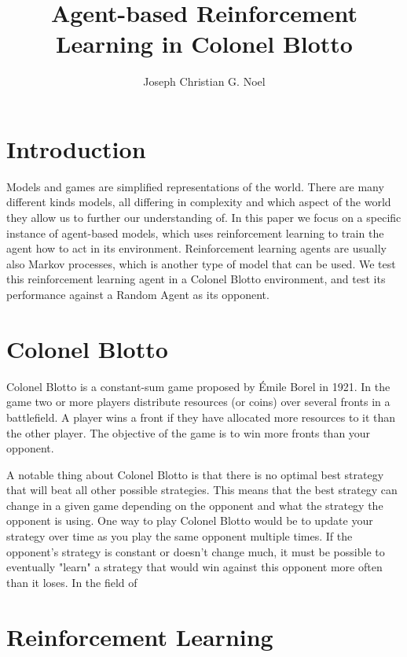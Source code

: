 \documentclass[11pt, oneside]{article}   	%
\title{Agent-based Reinforcement Learning in Colonel Blotto}
\author{Joseph Christian G. Noel}
\date{}							%
\begin{document}
\maketitle

\section{Introduction}

Models and games are simplified representations of the world. There are many different kinds models, all differing in complexity and which aspect of the world they allow us to further our understanding of. In this paper we focus on a specific instance of agent-based models, which uses reinforcement learning to train the agent how to act in its environment. Reinforcement learning agents are usually also Markov processes, which is another type of model that can be used. We test this reinforcement learning agent in a Colonel Blotto environment, and test its performance against a Random Agent as its opponent.

\section{Colonel Blotto}


Colonel Blotto is a constant-sum game proposed by Émile Borel in 1921\cite{Borel1953}. In the game two or more players distribute resources (or coins) over several fronts in a battlefield. A player wins a front if they have allocated more resources to it than the other player. The objective of the game is to win more fronts than your opponent.

\hfill

A notable thing about Colonel Blotto is that there is no optimal best strategy that will beat all other possible strategies. This means that the best strategy can change in a given game depending on the opponent and what the strategy the opponent is using. One way to play Colonel Blotto would be to update your strategy over time as you play the same opponent multiple times. If the opponent's strategy is constant or doesn't change much, it must be possible to eventually "learn" a strategy that would win against this opponent more often than it loses. In the field of 

\section{Reinforcement Learning}
\end{document}
